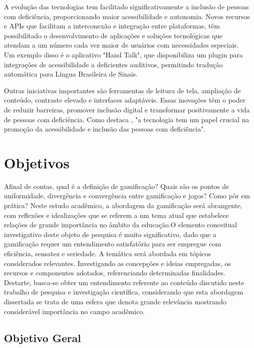 A evolução das tecnologias tem facilitado significativamente a inclusão de pessoas com deficiência, proporcionando maior acessibilidade e autonomia. Novos recursos e APIs que facilitam a interconexão e integração entre plataformas, têm possibilitado o desenvolvimento de aplicações e soluções tecnológicas que atendam a um número cada vez maior de usuários com necessidades especiais. Um exemplo disso é o aplicativo "Hand Talk", que disponibiliza um plugin para integrações de acessibilidade a deficientes auditivos, permitindo tradução automática para Língua Brasileira de Sinais.

Outras iniciativas importantes são ferramentas de leitura de tela, ampliação de conteúdo, contraste elevado e interfaces adaptáveis. Essas inovações têm o poder de reduzir barreiras, promover inclusão digital e transformar positivamente a vida de pessoas com deficiência. Como destaca  \cite{furlan2016desenvolvimento}, "a tecnologia tem um papel crucial na promoção da acessibilidade e inclusão das pessoas com deficiência".


\section{Objetivos}

Afinal de contas, qual é a definição de gamificação? Quais são os pontos de uniformidade, divergência e convergência entre gamificação e jogos? Como pôr em prática? Neste estudo acadêmico, a abordagem da gamificação será abrangente, com reflexões e idealizações que se referem a um tema atual que estabelece relações de grande importância no âmbito da educação.O elemento conceitual investigativo deste objeto de pesquisa é muito significativo, dado que a gamificação requer um entendimento satisfatório para ser empregue com eficiência, sensatez e seriedade. A temática será abordada em tópicos considerados relevantes. Investigando as concepções e ideias empregadas, os recursos e componentes adotados, referenciando determinadas finalidades. Destarte, busca-se obter um entendimento referente ao conteúdo discutido neste trabalho de pesquisa e investigação científica, considerando que esta abordagem dissertada se trata de uma esfera que denota grande relevância mostrando considerável importância no campo acadêmico.


\subsection{Objetivo Geral}

